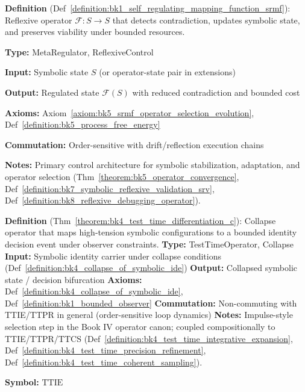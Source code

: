\begin{description}[leftmargin=2.5cm, style=nextline]
\item[\textbf{Self-Regulating Mapping Function} \hfill \ensuremath{\mathrm{SRMF}}] 
\label{dict:appA_self_regulating_mapping_function}
\textbf{Definition} (Def~\ref{definition:bk1_self_regulating_mapping_function_srmf}): Reflexive operator \( \mathcal{F}: S \to S \) that detects contradiction, updates symbolic state, and preserves viability under bounded resources.

\textbf{Type:} MetaRegulator, ReflexiveControl

\textbf{Input:} Symbolic state \( S \) (or operator-state pair in extensions)

\textbf{Output:} Regulated state \( \mathcal{F}(S) \) with reduced contradiction and bounded cost

\textbf{Axioms:} Axiom~\ref{axiom:bk5_srmf_operator_selection_evolution}, Def~\ref{definition:bk5_process_free_energy}

\textbf{Commutation:} Order-sensitive with drift/reflection execution chains

\textbf{Notes:} Primary control architecture for symbolic stabilization,
adaptation, and operator selection (Thm~\ref{theorem:bk5_operator_convergence},
Def~\ref{definition:bk7_symbolic_reflexive_validation_srv},
Def~\ref{definition:bk8_reflexive_debugging_operator}).

\item[\textbf{Test-Time Differentiation Collapse} \hfill \ensuremath{\mathrm{TTDC}}] 
\label{dict:appA_test_time_differentiation_collapse}
\textbf{Definition} (Thm~\ref{theorem:bk4_test_time_differentiation_c}): Collapse operator that maps high-tension symbolic configurations to a bounded identity decision event under observer constraints.
\textbf{Type:} TestTimeOperator, Collapse
\textbf{Input:} Symbolic identity carrier under collapse conditions (Def~\ref{definition:bk4_collapse_of_symbolic_ide})
\textbf{Output:} Collapsed symbolic state / decision bifurcation
\textbf{Axioms:} Def~\ref{definition:bk4_collapse_of_symbolic_ide}, Def~\ref{definition:bk1_bounded_observer}
\textbf{Commutation:} Non-commuting with TTIE/TTPR in general (order-sensitive loop dynamics)
\textbf{Notes:} Impulse-style selection step in the Book IV operator canon; coupled compositionally to TTIE/TTPR/TTCS (Def~\ref{definition:bk4_test_time_integrative_expansion}, Def~\ref{definition:bk4_test_time_precision_refinement}, Def~\ref{definition:bk4_test_time_coherent_sampling}).

\item[\textbf{Test-Time Integrative Expansion}] 
\label{dict:appA_test_time_integrative_expansion}
\textbf{Symbol:} \( \mathrm{TTIE} \)


\end{description}
